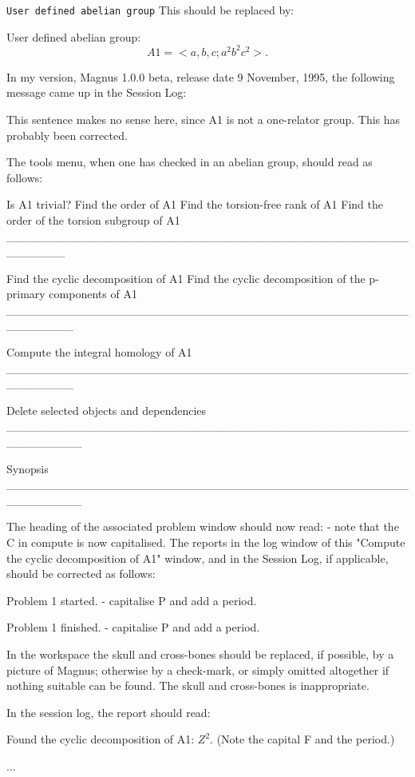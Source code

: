 \ni
{\tt User defined abelian group}
\m\ni This should be replaced by: 

\m\ni User defined abelian group:
$$ A1=<a,b,c;a^2 b^2 c^2>.$$

\m\ni In my version, Magnus 1.0.0 beta, release date 9 November, 1995, 
the following message came up in the Session Log:

\m{} This sentence makes no sense here, since A1 is 
not a one-relator group. This has probably been corrected.

\m\ni The tools menu, when one has checked in an abelian group,
should read as follows:

Is A1 trivial?
Find the order of A1
Find the torsion-free rank of A1
Find the order of the torsion subgroup of A1
_______________________________________________________

Find the cyclic decomposition of A1
Find the cyclic decomposition of the
p-primary components of A1
________________________________________________________

Compute the integral homology of A1
________________________________________________________

Delete selected objects and dependencies
_________________________________________________________

Synopsis
_________________________________________________________


\m\ni The heading of the associated problem window should now read:
\m{} - note that the C in
compute is now capitalised.
\m\ni
The reports in the log window of this "Compute the 
cyclic decomposition of A1" window, and  in the Session Log, if
applicable, should be corrected as follows: 

\ni Problem 1 started.  - capitalise P and add a period.

\ni   Problem 1 finished.  - capitalise P and add a period.

\m\ni In the workspace the skull and cross-bones should
be replaced, if possible, by a picture of Magnus; otherwise
by a check-mark, or simply omitted altogether if nothing
suitable can be found. The skull and cross-bones is inappropriate.

\m\ni In the session log, the report should read:

\ni  Found the cyclic decomposition of A1: $Z^2$.  
(Note the capital F and the period.)

...

